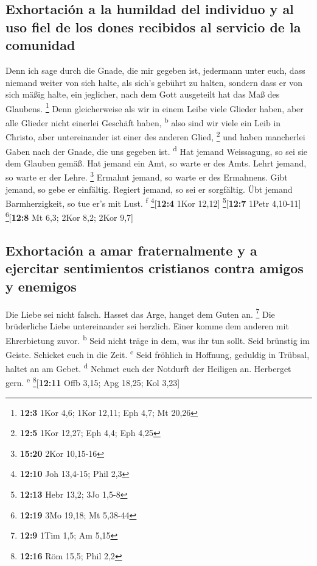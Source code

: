 \hypertarget{exhortaciuxf3n-a-la-humildad-del-individuo-y-al-uso-fiel-de-los-dones-recibidos-al-servicio-de-la-comunidad}{%
\subsection{Exhortación a la humildad del individuo y al uso fiel de los
dones recibidos al servicio de la
comunidad}\label{exhortaciuxf3n-a-la-humildad-del-individuo-y-al-uso-fiel-de-los-dones-recibidos-al-servicio-de-la-comunidad}}

 Denn ich sage durch die Gnade, die mir gegeben ist,
jedermann unter euch, dass niemand weiter von sich halte, als sich's
gebührt zu halten, sondern dass er von sich mäßig halte, ein jeglicher,
nach dem Gott ausgeteilt hat das Maß des Glaubens. \footnote{\textbf{12:3}
  1Kor 4,6; 1Kor 12,11; Eph 4,7; Mt 20,26}  Denn
gleicherweise als wir in einem Leibe viele Glieder haben, aber alle
Glieder nicht einerlei Geschäft haben, \textsuperscript{b}
 also sind wir viele ein Leib in Christo, aber
untereinander ist einer des anderen Glied, \footnote{\textbf{12:5} 1Kor
  12,27; Eph 4,4; Eph 4,25}  und haben mancherlei Gaben
nach der Gnade, die uns gegeben ist. \textsuperscript{d} 
Hat jemand Weissagung, so sei sie dem Glauben gemäß. Hat jemand ein Amt,
so warte er des Amts. Lehrt jemand, so warte er der Lehre. \footnote{\textbf{15:20}
  2Kor 10,15-16}  Ermahnt jemand, so warte er des
Ermahnens. Gibt jemand, so gebe er einfältig. Regiert jemand, so sei er
sorgfältig. Übt jemand Barmherzigkeit, so tue er's mit Lust.
\textsuperscript{f} \footnote{\textbf{12:10} Joh 13,4-15; Phil 2,3}{[}\textbf{12:4}
1Kor 12,12{]} \footnote{\textbf{12:13} Hebr 13,2; 3Jo 1,5-8}{[}\textbf{12:7}
1Petr 4,10-11{]} \footnote{\textbf{12:19} 3Mo 19,18; Mt 5,38-44}{[}\textbf{12:8}
Mt 6,3; 2Kor 8,2; 2Kor 9,7{]}

\hypertarget{exhortaciuxf3n-a-amar-fraternalmente-y-a-ejercitar-sentimientos-cristianos-contra-amigos-y-enemigos}{%
\subsection{Exhortación a amar fraternalmente y a ejercitar sentimientos
cristianos contra amigos y
enemigos}\label{exhortaciuxf3n-a-amar-fraternalmente-y-a-ejercitar-sentimientos-cristianos-contra-amigos-y-enemigos}}

 Die Liebe sei nicht falsch. Hasset das Arge, hanget dem
Guten an. \footnote{\textbf{12:9} 1Tim 1,5; Am 5,15}  Die
brüderliche Liebe untereinander sei herzlich. Einer komme dem anderen
mit Ehrerbietung zuvor. \textsuperscript{b}  Seid nicht
träge in dem, was ihr tun sollt. Seid brünstig im Geiste. Schicket euch
in die Zeit. \textsuperscript{c}  Seid fröhlich in
Hoffnung, geduldig in Trübsal, haltet an am Gebet. \textsuperscript{d}
 Nehmet euch der Notdurft der Heiligen an. Herberget
gern. \textsuperscript{e} \footnote{\textbf{12:16} Röm 15,5; Phil 2,2}{[}\textbf{12:11}
Offb 3,15; Apg 18,25; Kol 3,23{]}

